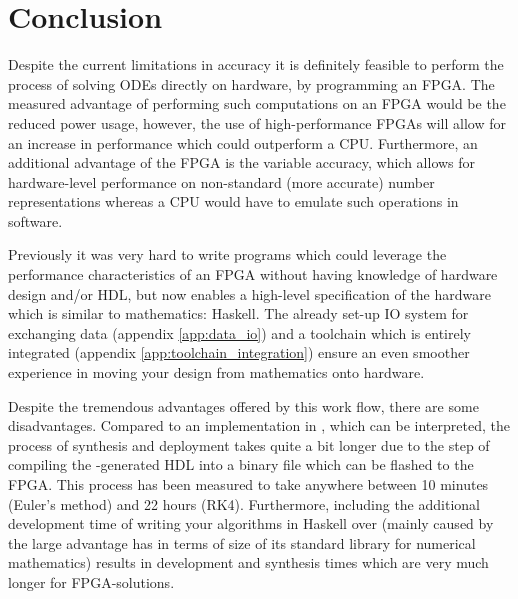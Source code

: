 \chapter{Conclusion}
Despite the current limitations in accuracy it is definitely feasible to perform the process of solving ODEs directly on hardware, by programming an FPGA. The measured advantage of performing such computations on an FPGA would be the reduced power usage, however, the use of high-performance FPGAs will allow for an increase in performance which could outperform a CPU. Furthermore, an additional advantage of the FPGA is the variable accuracy, which allows for hardware-level performance on non-standard (more accurate) number representations whereas a CPU would have to emulate such operations in software.

Previously it was very hard to write programs which could leverage the performance characteristics of an FPGA without having knowledge of hardware design and/or HDL, but now \clash{} enables a high-level specification of the hardware which is similar to mathematics: Haskell. The already set-up IO system for exchanging data (appendix \ref{app:data_io}) and a toolchain which is entirely integrated (appendix \ref{app:toolchain_integration}) ensure an even smoother experience in moving your design from mathematics onto hardware. 

Despite the tremendous advantages offered by this work flow, there are some disadvantages. Compared to an implementation in \matlab{}, which can be interpreted, the process of synthesis and deployment takes quite a bit longer due to the step of compiling the \clash{}-generated HDL into a binary file which can be flashed to the FPGA. This process has been measured to take anywhere between 10 minutes (Euler's method) and 22 hours (RK4). Furthermore, including the additional development time of writing your algorithms in Haskell over \matlab{} (mainly caused by the large advantage \matlab{} has in terms of size of its standard library for numerical mathematics) results in development and synthesis times which are very much longer for FPGA-solutions.